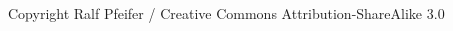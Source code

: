 \documentclass[11pt,aspectratio=169]{beamer}
\begin{document}
\begin{frame}
\begin{itemize}
\begin{center}
\begin{overlayarea}{8cm}{5.5cm}
			\end{overlayarea}
			\hspace{-1cm} \tiny{Copyright \textcopyright {} Ralf Pfeifer / Creative Commons Attribution-ShareAlike 3.0}
		\end{center}
	\end{itemize}
\end{frame}
\end{document}
